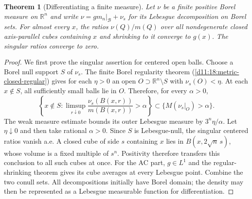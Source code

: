 \documentclass[11pt,oneside,openany]{book}
\newtheorem{theorem}{Theorem}[chapter]
\theoremstyle{definition}
\theoremstyle{remark}
\newcommand{\R}{\mathbb R}\newcommand{\C}{\mathbb C}
\newcommand{\BB}{\mathcal B}\newcommand{\SSS}{\mathcal S}
\newcommand{\family}[1]{}
\begin{document}
\begin{theorem}[Differentiating a finite measure]\family{D11.13.measure_differentiation}\label{d11:13:measure-differentiation}
Let $\nu$ be a finite positive Borel measure on $\R^n$ and write
$\nu=g m_n|_{\BB}+\nu_s$ for its Lebesgue decomposition on Borel sets.
For almost every $x$, the ratios $\nu(Q)/m(Q)$ over all nondegenerate
closed axis-parallel cubes containing $x$ and shrinking to it converge to
$g(x)$. The singular ratios converge to zero.
\end{theorem}
\begin{proof}
We first prove the singular assertion for centered open balls. Choose a
Borel null support $S$ of $\nu_s$. The finite Borel regularity theorem
(\cref{d11:18:metric-closed-regular}) gives for each $\eta>0$ an open
$O\supset\R^n\setminus S$ with $\nu_s(O)<\eta$. At each $x\notin S$,
all sufficiently small balls lie in $O$. Therefore, for every $\alpha>0$,
\[
 \left\{x\notin S:\limsup_{r\downarrow0}
 \frac{\nu_s(B(x,r))}{m(B(x,r))}>\alpha\right\}
 \subset\{M(\nu_s|_O)>\alpha\}.
\]
The weak measure estimate bounds its outer Lebesgue measure by
$3^n\eta/\alpha$. Let $\eta\downarrow0$ and then take rational
$\alpha>0$. Since $S$ is Lebesgue-null, the singular centered ratios
vanish a.e. A closed cube of side $s$ containing $x$ lies in
$B(x,2\sqrt n\,s)$, whose volume is a fixed multiple of $s^n$.
Positivity therefore transfers this conclusion to all such cubes at once.
For the AC part, $g\in L^1$ and the regular-shrinking theorem gives its
cube averages at every Lebesgue point. Combine the two conull sets.
All decompositions initially have Borel domain; the density may then be
represented as a Lebesgue measurable function for differentiation.
\end{proof}
\end{document}

